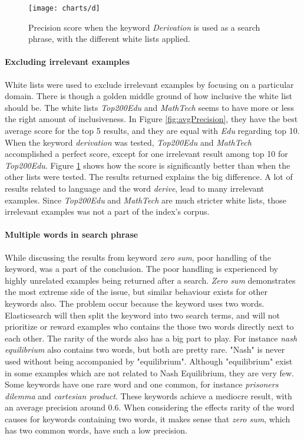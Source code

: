\begin{figure}[h] 
\caption{Precision score when the keyword \textit{Derivation} is used as a search phrase, with the different white lists applied.}
\texttt{[image: charts/d]}
\label{fig:d}
\end{figure}

\paragraph{Excluding irrelevant examples}
White lists were used to exclude irrelevant examples by focusing on a particular domain. There is though a golden middle ground of how inclusive the white list should be. The white lists \textit{Top200Edu} and \textit{MathTech} seems to have more or less the right amount of inclusiveness. In Figure \ref{fig:avgPrecision}, they have the best average score for the top 5 results, and they are equal with \textit{Edu} regarding top 10. When the keyword \textit{derivation} was tested, \textit{Top200Edu} and \textit{MathTech} accomplished a perfect score, except for one irrelevant result among top 10 for \textit{Top200Edu}. Figure \ref{fig:d} shows how the score is significantly better than when the other lists were tested. The results returned explains the big difference. A lot of results related to language and the word \textit{derive}, lead to many irrelevant examples. Since \textit{Top200Edu} and \textit{MathTech} are much stricter white lists, those irrelevant examples was not a part of the index's corpus.

\paragraph{Multiple words in search phrase}
While discussing the results from keyword \textit{zero sum}, poor handling of the keyword, was a part of the conclusion. The poor handling is experienced by highly unrelated examples being returned after a search. \textit{Zero sum} demonstrates the most extreme side of the issue, but similar behaviour exists for other keywords also. The problem occur because the keyword uses two words. Elasticsearch will then split the keyword into two search terms, and will not prioritize or reward examples who contains the those two words directly next to each other. The rarity of the words also has a big part to play. For instance \textit{nash equilibrium} also contains two words, but both are pretty rare. "Nash" is never used without being accompanied by "equilibrium". Although "equilibrium" exist in some examples which are not related to Nash Equilibrium, they are very few. Some keywords have one rare word and one common, for instance \textit{prisoners dilemma} and \textit{cartesian product}. These keywords achieve a mediocre result, with an average precision around 0.6. When considering the effects rarity of the word causes for keywords containing two words, it makes sense that \textit{zero sum}, which has two common words, have such a low precision. 

